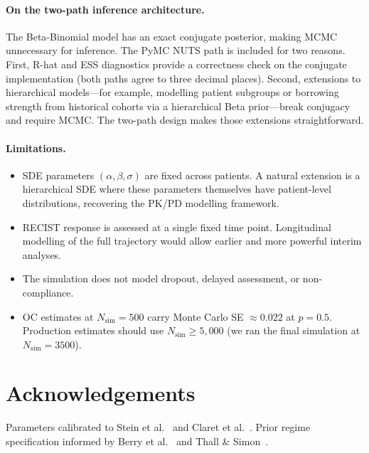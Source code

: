 \documentclass[11pt,a4paper]{article}
\begin{document}
\paragraph{On the two-path inference architecture.}
The Beta-Binomial model has an exact conjugate posterior, making MCMC
unnecessary for inference. The PyMC NUTS path is included for two reasons.
First, R-hat and ESS diagnostics provide a correctness check on the conjugate
implementation (both paths agree to three decimal places). Second, extensions
to hierarchical models---for example, modelling patient subgroups or borrowing
strength from historical cohorts via a hierarchical Beta prior---break conjugacy
and require MCMC. The two-path design makes those extensions straightforward.
 
\paragraph{Limitations.}
\begin{itemize}
  \item SDE parameters $(\alpha, \beta, \sigma)$ are fixed across patients.
        A natural extension is a hierarchical SDE where these parameters
        themselves have patient-level distributions, recovering the PK/PD
        modelling framework.
  \item RECIST response is assessed at a single fixed time point. Longitudinal
        modelling of the full trajectory would allow earlier and more powerful
        interim analyses.
  \item The simulation does not model dropout, delayed assessment, or
        non-compliance.
  \item OC estimates at $N_{\text{sim}} = 500$ carry Monte Carlo SE $\approx 0.022$
        at $p = 0.5$. Production estimates should use $N_{\text{sim}} \geq 5{,}000$ (we ran the final simulation at $N_{\text{sim}} = 3500$).
\end{itemize}
 
\section*{Acknowledgements}
 
Parameters calibrated to Stein et al.~\cite{Stein2011} and Claret et
al.~\cite{Claret2013}. Prior regime specification informed by Berry et
al.~\cite{Berry2010} and Thall \& Simon~\cite{Thall1994}.
 
\end{document}
